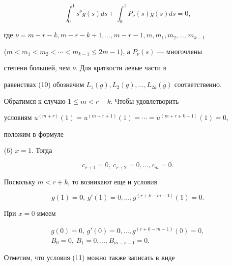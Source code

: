 \begin{equation} 


\int^1_0 s^\nu g(s)ds +\int^1_0 P_\nu(s)g(s)ds=0, 


\end{equation} 


где $\nu=m-r-k,m-r-k+1,\dotsc,m-r-1,m,m_1,m_2,\dotsc,m_{k-1}$ 


($m<m_1<m_2<\dotsb<m_{k-1}\le 2m-1$), а $P_\nu(s)$ --- многочлены  


степени большей, чем $\nu$. Для краткости левые части в  


равенствах (10) обозначим $L_1(g),L_2(g),\dotsc,L_{2k}(g)$ соответственно. 


 


Обратимся к случаю $1\le m<r+k$. Чтобы удовлетворить 


условиям $u^{(m+r)}(1)=u^{(m+r+1)}(1)=\dotsb=u^{(m+r+k-1)}(1)=0$, 


положим в формуле  


(6) $x=1$. Тогда 


\begin{equation} 


c_{r+1}=0,\ c_{r+2}=0,\dotsc,c_m=0. 


\end{equation} 


Поскольку $m<r+k$, то возникают еще и условия 


\begin{equation} 


g(1)=0,\ g'(1)=0,\dotsc,g^{(r+k-m-1)}(1)=0. 


\end{equation} 


При $x=0$ имеем


\begin{equation} 


\begin{array}{c} 


g(0)=0,\ g'(0)=0,\dotsc,g^{(r+k-m-1)}(0)=0,\\[2mm] 


B_0=0,\ B_1=0,\dotsc,B_{m-r-1}=0. 


\end{array} 


\end{equation} 


 


Отметим, что условия (11) можно также записать в виде 


